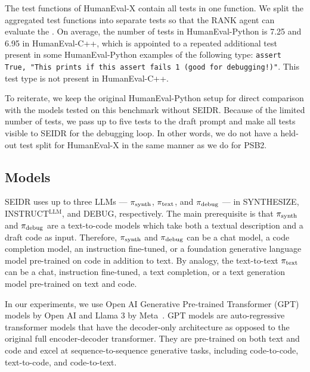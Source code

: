 The test functions of HumanEval-X contain all tests in one function. We split the aggregated test functions into separate tests so that the RANK agent can evaluate the . 
On average, the number of tests in HumanEval-Python is 7.25 and 6.95 in HumanEval-C++, which is appointed to a repeated additional test present in some HumanEval-Python examples of the following type: \texttt{assert True, "This prints if this assert fails 1 (good for debugging!)"}.
This test type is not present in HumanEval-C++.

To reiterate, we keep the original HumanEval-Python setup for direct comparison with the models tested on this benchmark without SEIDR. 
Because of the limited number of tests, we pass up to five tests to the draft prompt and make all tests visible to SEIDR for the debugging loop. 
In other words, we do not have a held-out test split for HumanEval-X in the same manner as we do for PSB2.


\newpage\subsection{Models}
\label{sec:seidr-models}

SEIDR uses up to three LLMs --- $ \pi_\text{synth} $, $ \pi_\text{text} $, and $ \pi_\text{debug} $ ---
in SYNTHESIZE, INSTRUCT$^{\text{LLM}}$, and DEBUG, respectively. 
The main prerequisite is that $ \pi_\text{synth} $ and $ \pi_\text{debug} $ are a text-to-code models which take both a textual description and a draft code as input.
Therefore, $ \pi_\text{synth} $ and $ \pi_\text{debug} $ can be a chat model, a code completion model, an instruction fine-tuned, or a foundation generative language model pre-trained on code in addition to text. 
By analogy, the text-to-text $ \pi_\text{text} $ can be a chat, instruction fine-tuned, a text completion, or a text generation model pre-trained on text and code.

In our experiments, we use Open AI Generative Pre-trained Transformer (GPT) models by Open AI and Llama 3 by Meta~\cite{roziereCodeLlamaOpen2024}. 
GPT models are auto-regressive transformer models that have the decoder-only architecture as opposed to the original full encoder-decoder transformer.
They are pre-trained on both text and code and excel at sequence-to-sequence generative tasks, including code-to-code, text-to-code, and code-to-text.

